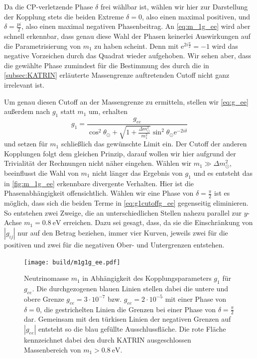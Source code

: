 Da die CP-verletzende Phase $\delta$ frei wählbar ist, wählen wir hier zur Darstellung der Kopplung stets die beiden Extreme $\delta = 0$, also einen maximal positiven, und $\delta = \frac{pi}{2}$, also einen maximal negativen Phasenbeitrag.
An \eqref{eq:m_1g_ee} wird aber schnell erkennbar, dass genau diese Wahl der Phasen keinerlei Auswirkungen auf die Parametrisierung von $m_1$ zu haben scheint.
Denn mit $\mathrm{e}^{2 i \frac{\pi}{2}} = -1$ wird das negative Vorzeichen durch das Quadrat wieder aufgehoben.
Wir sehen aber, dass die gewählte Phase zumindest für die Bestimmung des durch die in \autoref{subsec:KATRIN} erläuterte Massengrenze auftretenden Cutoff nicht ganz irrelevant ist.

Um genau diesen Cutoff an der Massengrenze zu ermitteln, stellen wir \eqref{eq:g_ee} außerdem nach $g_1$ statt $m_1$ um, erhalten
\begin{equation}
    g_1 = \frac{g_{ee}}{\cos^2\theta_\odot + \sqrt{1 + \frac{\Delta m^2_\odot}{m^2_1}} \sin^2\theta_\odot \mathrm{e}^{-2 i \delta}} 
    \label{eq:g1cutoffg_ee}
\end{equation}
und setzen für $m_1$ schließlich das gewünschte Limit ein.
Der Cutoff der anderen Kopplungen folgt dem gleichen Prinzip, darauf wollen wir hier aufgrund der Trivialität der Rechnungen nicht näher eingehen.
Wählen wir $m_1 \gg \Delta m^2_\odot$, beeinflusst die Wahl von $m_1$ nicht länger das Ergebnis von $g_1$ und es entsteht das in \autoref{fig:m_1g_ee} erkennbare divergente Verhalten.
Hier ist die Phasenabhängigkeit offensichtlich.
Wählen wir eine Phase von $\delta = \frac{\pi}{2}$ ist es möglich, dass sich die beiden Terme in \eqref{eq:g1cutoffg_ee} gegenseitig eliminieren.
So entstehen zwei Zweige, die an unterschiedlichen Stellen nahezu parallel zur $y$-Achse $m_1 = \SI{0.8}{\eV}$ erreichen.
Dazu sei gesagt, dass, da sie die Einschränkung von $|g_{i j}|$ nur auf den Betrag beziehen, immer vier Kurven, jeweils zwei für die positiven und zwei für die negativen Ober- und Untergrenzen entstehen.
\begin{figure}[H]
    \centering
    \texttt{[image: build/m1g1g\_ee.pdf]}
    \caption{Neutrinomasse $m_1$ in Abhängigkeit des Kopplungsparameters $g_1$ für $g_{ee}$. Die durchgezogenen blauen Linien stellen dabei die untere und obere Grenze $g_{ee} = 3 \cdot 10^{-7}$ bzw. $g_{ee} = 2 \cdot 10^{-5}$
            mit einer Phase von $\delta = 0$, die gestrichelten Linien die Grenzen bei einer Phase von $\delta = \frac{\pi}{2}$ dar. Gemeinsam mit den türkisen Linien der negativen Grenzen auf $|g_{ee}|$ entsteht so die blau
            gefüllte Ausschlussfläche. Die rote Fläche kennzeichnet dabei den durch KATRIN ausgeschlossen Massenbereich von $m_1 > \SI{0.8}{\eV}$.}
    \label{fig:m_1g_ee}
\end{figure}
